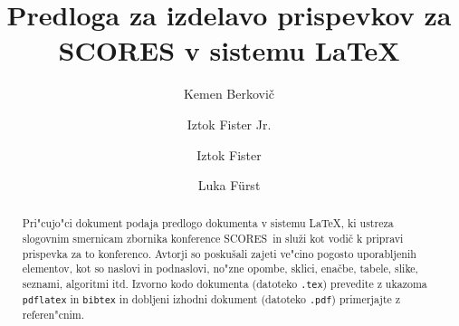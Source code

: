 \documentclass[sigconf,nonacm]{acmart}
\newcommand{\scores}{\textsc{SCORES}}
\begin{document}
\title{Predloga za izdelavo prispevkov za SCORES v sistemu \LaTeX}


\author{Kemen Berkovič}

\author{Iztok Fister Jr.}

\author{Iztok Fister}

\author{Luka F\"{u}rst}

\begin{abstract}
    Pri"cujo"ci dokument podaja predlogo dokumenta v sistemu \LaTeX, ki
    ustreza slogovnim smernicam zbornika konference \scores\ in služi kot
    vodič k pripravi prispevka za to konferenco.  Avtorji so poskušali zajeti
    ve"cino pogosto uporabljenih elementov, kot so naslovi in podnaslovi,
    no"zne opombe, sklici, enačbe, tabele, slike, seznami, algoritmi itd.
    Izvorno kodo dokumenta (datoteko \texttt{.tex}) prevedite z ukazoma
    \texttt{pdflatex} in \texttt{bibtex} in dobljeni izhodni dokument
    (datoteko \texttt{.pdf}) primerjajte z referen"cnim.
\end{abstract}
\end{document}
